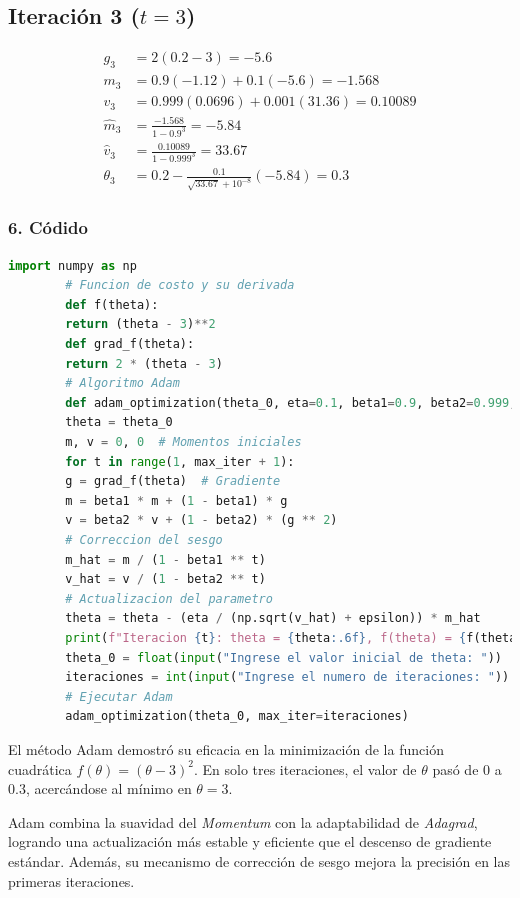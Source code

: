 \documentclass[a5paper]{article}
\begin{document}
	\subsection*{Iteración 3 ($t=3$)}
	\begin{align*}
		g_3 &= 2(0.2 - 3) = -5.6 \\
		m_3 &= 0.9(-1.12) + 0.1(-5.6) = -1.568 \\
		v_3 &= 0.999(0.0696) + 0.001(31.36) = 0.10089 \\
		\hat{m}_3 &= \frac{-1.568}{1 - 0.9^3} = -5.84 \\
		\hat{v}_3 &= \frac{0.10089}{1 - 0.999^3} = 33.67 \\
		\theta_3 &= 0.2 - \frac{0.1}{\sqrt{33.67} + 10^{-8}} (-5.84) = 0.3
	\end{align*}
	
	\subsubsection*{6. Códido}
	\begin{lstlisting}[language=Python, caption=Adaptive Moment Estimation, frame=single]
		import numpy as np
		# Funcion de costo y su derivada
		def f(theta):
		return (theta - 3)**2
		def grad_f(theta):
		return 2 * (theta - 3)
		# Algoritmo Adam
		def adam_optimization(theta_0, eta=0.1, beta1=0.9, beta2=0.999, epsilon=1e-8, max_iter=5):
		theta = theta_0
		m, v = 0, 0  # Momentos iniciales
		for t in range(1, max_iter + 1):
		g = grad_f(theta)  # Gradiente
		m = beta1 * m + (1 - beta1) * g
		v = beta2 * v + (1 - beta2) * (g ** 2)
		# Correccion del sesgo
		m_hat = m / (1 - beta1 ** t)
		v_hat = v / (1 - beta2 ** t)
		# Actualizacion del parametro
		theta = theta - (eta / (np.sqrt(v_hat) + epsilon)) * m_hat
		print(f"Iteracion {t}: theta = {theta:.6f}, f(theta) = {f(theta):.6f}")
		theta_0 = float(input("Ingrese el valor inicial de theta: "))
		iteraciones = int(input("Ingrese el numero de iteraciones: "))
		# Ejecutar Adam
		adam_optimization(theta_0, max_iter=iteraciones)
	\end{lstlisting}
	
	El método Adam demostró su eficacia en la minimización de la función cuadrática \( f(\theta) = (\theta - 3)^2 \). En solo tres iteraciones, el valor de \( \theta \) pasó de \( 0 \) a \( 0.3 \), acercándose al mínimo en \( \theta = 3 \).
	
	Adam combina la suavidad del \textit{Momentum} con la adaptabilidad de \textit{Adagrad}, logrando una actualización más estable y eficiente que el descenso de gradiente estándar. Además, su mecanismo de corrección de sesgo mejora la precisión en las primeras iteraciones.
	
\end{document}
